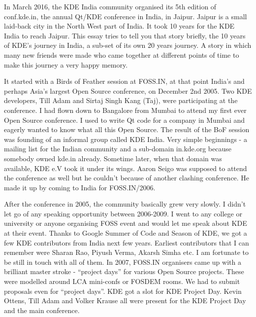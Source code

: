 


\noindent{}In March 2016, the KDE India community organised its 5th edition of conf.kde.in, the annual Qt/KDE conference in India, in Jaipur. Jaipur is a small laid-back city in the North West part of India. It took 10 years for the KDE India to reach Jaipur. This essay tries to tell you that story briefly, the 10 years of KDE’s journey in India, a sub-set of its own 20 years journey. A story in which many new friends were made who came together at different points of time to make this journey a very happy memory.

It started with a Birds of Feather session at FOSS.IN, at that point India’s and perhaps Asia’s largest Open Source conference, on December 2nd 2005. Two KDE developers, Till Adam and Sirtaj Singh Kang (Taj), were participating at the conference. I had flown down to Bangalore from Mumbai to attend my first ever Open Source conference. I used to write Qt code for a company in Mumbai and eagerly wanted to know what all this Open Source. The result of the BoF session was founding of an informal group called KDE India. Very simple beginnings - a mailing list for the Indian community and a sub-domain in.kde.org because somebody owned kde.in already. Sometime later, when that domain was available, KDE e.V took it under its wings. Aaron Seigo was supposed to attend the conference as well but he couldn’t because of another clashing conference. He made it up by coming to India for FOSS.IN/2006.

After the conference in 2005, the community basically grew very slowly. I didn’t let go of any speaking opportunity between 2006-2009. I went to any college or university or anyone organising FOSS event and would let me speak about KDE at their event.  Thanks to Google Summer of Code and Season of KDE, we got a few KDE contributors from India next few years. Earliest contributors that I can remember were Sharan Rao, Piyush Verma, Akarsh Simha etc. I am fortunate to be still in touch with all of them. In 2007, FOSS.IN organisers came up with a brilliant master stroke - “project days” for various Open Source projects. These were modelled around LCA mini-confs or FOSDEM rooms. We had to submit proposals even for “project days”. KDE got a slot for KDE Project Day.  Kevin Ottens, Till Adam and Volker Krause all were present for the KDE Project Day and the main conference. 

